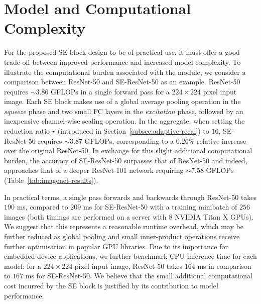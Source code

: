 \section{Model and Computational Complexity}
\label{sec:modelcapacity}

For the proposed SE block design to be of practical use, it must offer a good trade-off between improved performance and increased model complexity. 
To illustrate the computational burden associated with the module, we consider a comparison between ResNet-50 and SE-ResNet-50 as an example.  ResNet-50 requires ${\sim}3.86$ GFLOPs in a single forward pass for a $224\times224$ pixel input image. Each SE block makes use of a global average pooling operation in the \textit{squeeze} phase and two small FC layers in the \textit{excitation} phase, followed by an inexpensive channel-wise scaling operation. In the aggregate, when setting the reduction ratio $r$ (introduced in Section~\ref{subsec:adaptive-recal}) to $16$, SE-ResNet-50 requires ${\sim}3.87$ GFLOPs, corresponding to a $0.26\%$ relative increase over the original ResNet-50. In exchange for this slight additional computational burden, the accuracy of \mbox{SE-ResNet-50} surpasses that of ResNet-50 and indeed, approaches that of a deeper ResNet-101 network requiring ${\sim}7.58$ GFLOPs (Table~\ref{tab:imagenet-results}). 

In practical terms, a single pass forwards and backwards through ResNet-50 takes $190$ ms, compared to $209$ ms for SE-ResNet-50 with a training minibatch of $256$ images (both timings are performed on a server with $8$ NVIDIA Titan X GPUs).  We suggest that this represents a reasonable runtime overhead, which may be further reduced as global pooling and small inner-product operations receive further optimisation in popular GPU libraries. Due to its importance for embedded device applications, we further benchmark CPU inference time for each model: for a $224\times 224$ pixel input image, ResNet-50 takes $164$ ms in comparison to $167$ ms for SE-ResNet-50. We believe that the small additional computational cost incurred by the SE block is justified by its contribution to model performance.




